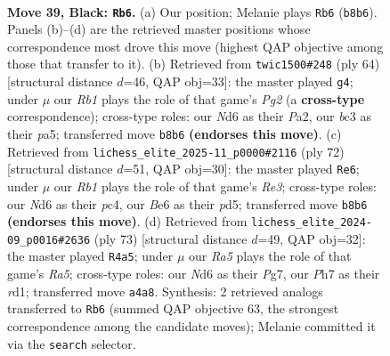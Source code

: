 \documentclass[11pt]{article}
\begin{document}
\clearpage

\begin{figure}[p]\centering
\begin{subfigure}{0.46\textwidth}\centering
\resizebox{\linewidth}{!}{%
\newchessgame
\chessboard[
  setfen={1r3k2/2R4p/3nb3/1p4p1/r7/2B1P1P1/P4PKP/4R3 b - - 3 39},
  showmover=false,
  pgfstyle=straightmove, color=movearrow, markmove={b8-b6}
]}
\caption{}
\end{subfigure}\hfill
\begin{subfigure}{0.46\textwidth}\centering
\resizebox{\linewidth}{!}{%
\newchessgame
\chessboard[
  setfen={1r6/2R5/4ppk1/p1P1r1p1/1p1R3p/5P2/P1PK2PP/8 w - - 0 33},
  showmover=false,
  pgfstyle=straightmove, color=movearrow, markmove={g2-g4}
]}
\caption{}
\end{subfigure}
\\[4pt]
\begin{subfigure}{0.46\textwidth}\centering
\resizebox{\linewidth}{!}{%
\newchessgame
\chessboard[
  setfen={8/5kp1/5b1p/3p1P1r/p1pP4/P3R1K1/8/3R4 w - - 0 37},
  showmover=false,
  pgfstyle=straightmove, color=movearrow, markmove={e3-e6}
]}
\caption{}
\end{subfigure}\hfill
\begin{subfigure}{0.46\textwidth}\centering
\resizebox{\linewidth}{!}{%
\newchessgame
\chessboard[
  setfen={r5k1/5pp1/2p1b3/6PR/r7/4BPP1/P3PK2/3R4 b - - 1 37},
  showmover=false,
  pgfstyle=straightmove, color=movearrow, markmove={a4-a5}
]}
\caption{}
\end{subfigure}
\caption{\textbf{Move 39, Black: \texttt{Rb6}.} (a) Our position; Melanie plays \texttt{Rb6} (\texttt{b8b6}). Panels (b)--(d) are the retrieved master positions whose correspondence most drove this move (highest QAP objective among those that transfer to it). (b) Retrieved from \texttt{twic1500\#248} (ply 64) [structural distance $d$=46, QAP obj=33]: the master played \texttt{g4}; under $\mu$ our \emph{Rb1} plays the role of that game's \emph{Pg2} (a \textbf{cross-type} correspondence); cross-type roles: our \emph{N}d6 as their \emph{P}a2, our \emph{b}c3 as their \emph{p}a5; transferred move \texttt{b8b6} \textbf{(endorses this move)}. (c) Retrieved from \texttt{lichess\_elite\_2025-11\_p0000\#2116} (ply 72) [structural distance $d$=51, QAP obj=30]: the master played \texttt{Re6}; under $\mu$ our \emph{Rb1} plays the role of that game's \emph{Re3}; cross-type roles: our \emph{N}d6 as their \emph{p}c4, our \emph{B}e6 as their \emph{p}d5; transferred move \texttt{b8b6} \textbf{(endorses this move)}. (d) Retrieved from \texttt{lichess\_elite\_2024-09\_p0016\#2636} (ply 73) [structural distance $d$=49, QAP obj=32]: the master played \texttt{R4a5}; under $\mu$ our \emph{Ra5} plays the role of that game's \emph{Ra5}; cross-type roles: our \emph{N}d6 as their \emph{P}g7, our \emph{P}h7 as their \emph{r}d1; transferred move \texttt{a4a8}. Synthesis: 2 retrieved analogs transferred to \texttt{Rb6} (summed QAP objective 63, the strongest correspondence among the candidate moves); Melanie committed it via the \texttt{search} selector.}
\label{fig:thought-m77}
\end{figure}
\end{document}
